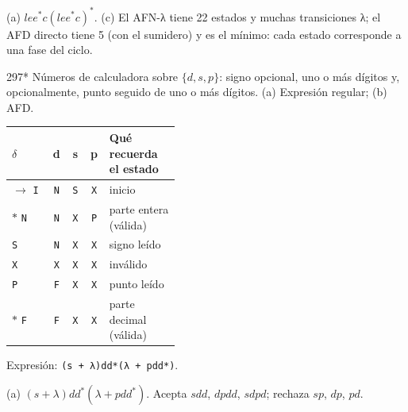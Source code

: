 \documentclass[11pt]{article}
\begin{document}
\resp (a) $lee^*c(lee^*c)^*$. (c) El AFN-λ tiene 22 estados y muchas transiciones λ; el AFD directo tiene 5 (con el sumidero) y es el mínimo: cada estado corresponde a una fase del ciclo.


\begin{ejercicio}{297}{*}
Números de calculadora sobre $\{d, s, p\}$: signo opcional, uno o más dígitos y, opcionalmente, punto seguido de uno o más dígitos. (a) Expresión regular; (b) AFD.
\end{ejercicio}
\proc \begin{center}\small\begin{tabular}{lcccp{0.42\linewidth}}\toprule
$\delta$ & d & s & p & Qué recuerda el estado \\\midrule
$\to$ \texttt{I} & \texttt{N} & \texttt{S} & \texttt{X} & inicio \\
$*$ \texttt{N} & \texttt{N} & \texttt{X} & \texttt{P} & parte entera (válida) \\
 \texttt{S} & \texttt{N} & \texttt{X} & \texttt{X} & signo leído \\
 \texttt{X} & \texttt{X} & \texttt{X} & \texttt{X} & inválido \\
 \texttt{P} & \texttt{F} & \texttt{X} & \texttt{X} & punto leído \\
$*$ \texttt{F} & \texttt{F} & \texttt{X} & \texttt{X} & parte decimal (válida) \\
\bottomrule\end{tabular}\end{center}
\par Expresión: \texttt{(s + λ)dd*(λ + pdd*)}.

\resp (a) $(s + \lambda)dd^*(\lambda + pdd^*)$. Acepta $sdd$, $dpdd$, $sdpd$; rechaza $sp$, $dp$, $pd$.
\end{document}
